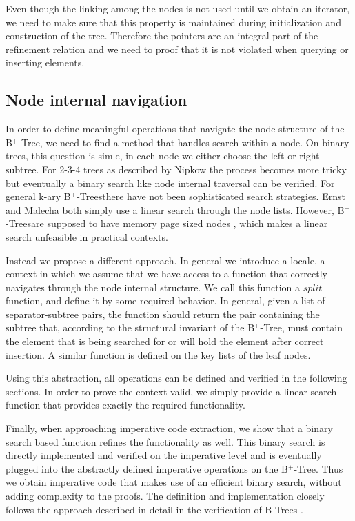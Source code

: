 \documentclass[a4paper,UKenglish,cleveref, autoref, thm-restate]{lipics-v2021}
\newcommand{\btree}{B$^+$-Tree}
\newcommand{\btrees}{B$^+$-Trees}
\begin{document}
Even though the linking among the nodes is not used until we obtain
an iterator, we need to make sure that this property is maintained
during initialization and construction of the tree.
Therefore the pointers are an integral part of the refinement relation
and we need to proof that it is not violated when querying or inserting elements.

\subsection{Node internal navigation}
\label{sec:split}

In order to define meaningful operations that navigate
the node structure of the \btree,
we need to find a method that handles search within a node.
On binary trees, this question is simle, in each node we either choose
the left or right subtree.
For 2-3-4 trees as described by Nipkow \cite{DBLP:conf/itp/Nipkow16} the process becomes more tricky
but eventually a binary search like node internal traversal can be verified.
For general k-ary \btrees there have not been sophisticated search strategies.
Ernst \cite{DBLP:journals/sosym/ErnstSR15} and Malecha \cite{DBLP:conf/popl/MalechaMSW10}
both simply use a linear search through the node lists.
However, \btrees are supposed to have memory page sized nodes \cite{DBLP:journals/csur/Comer79}, 
which makes a linear search unfeasible in practical contexts.

Instead we propose a different approach.
In general we introduce a locale, a context in which we assume that we
have access to a function that correctly navigates through the node internal structure.
We call this function a $split$ function, and define it by some required behavior.
In general, given a list of separator-subtree pairs, the function should
return the pair containing the subtree that, according to the structural invariant of the \btree,
must contain the element that is being searched for or will hold the element after correct insertion.
A similar function is defined on the key lists of the leaf nodes.

Using this abstraction, all operations can be defined and verified
in the following sections.
In order to prove the context valid, we simply provide a linear search function
that provides exactly the required functionality.

Finally, when approaching imperative code extraction,
we show that a binary search based function refines the
functionality as well.
This binary search is directly implemented and verified on the imperative
level and is eventually plugged into the abstractly defined
imperative operations on the \btree.
Thus we obtain imperative code that makes use of an efficient
binary search, without adding complexity to the proofs.
The definition and implementation closely follows
the approach described in detail in the
verification of B-Trees \cite{DBLP:journals/afp/Mundler21}.
\end{document}
